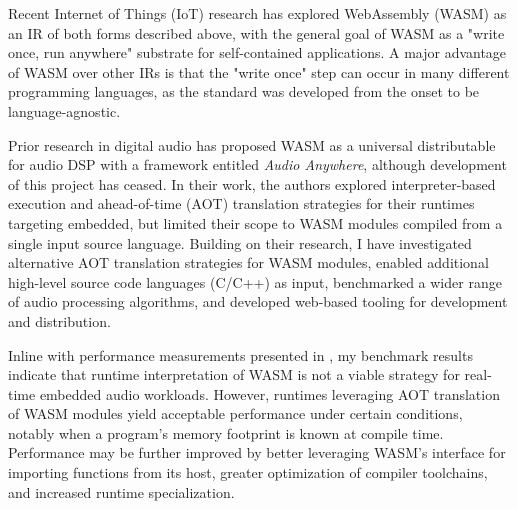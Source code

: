  Recent Internet of Things (IoT) research\cite{fi15080275}\cite{10756513}\cite{IOTW753} has explored WebAssembly (WASM) as an IR of both forms described above, with the general goal of WASM as a "write once, run anywhere" substrate for self-contained applications. A major advantage of WASM over other IRs is that the "write once" step can occur in many different programming languages, as the standard was developed from the onset to be language-agnostic\cite{og_wasm}.


Prior research in digital audio has proposed WASM as a universal distributable for audio DSP with a framework entitled \textit{Audio Anywhere}\cite{gaster2020audio}, although development of this project has ceased. In their work, the authors explored interpreter-based execution and ahead-of-time (AOT) translation strategies for their runtimes targeting embedded, but limited their scope to WASM modules compiled from a single input source language. Building on their research, I have investigated alternative AOT translation strategies for WASM modules, enabled additional high-level source code languages (C/C++) as input, benchmarked a wider range of audio processing algorithms, and developed web-based tooling for development and distribution.




Inline with performance measurements presented in \cite{gaster2020audio}, my benchmark results indicate that runtime interpretation of WASM is not a viable strategy for real-time embedded audio workloads. However, runtimes leveraging AOT translation of WASM modules yield acceptable performance under certain conditions, notably when a program's memory footprint is known at compile time. Performance may be further improved by better leveraging WASM's interface for importing functions from its host, greater optimization of compiler toolchains, and increased runtime specialization.

